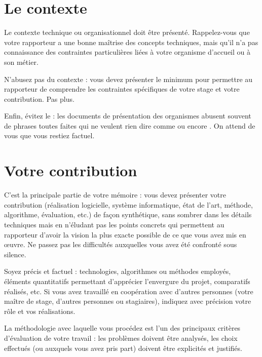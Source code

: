 \documentclass [twoside,openright,a4paper,11pt,french] {report}
\begin{document}
\section {Le contexte}

Le contexte technique ou organisationnel doit être présenté.
Rappelez-vous que votre rapporteur a une bonne maîtrise des concepts
techniques, mais qu'il n'a pas connaissance des contraintes particulières
liées à votre organisme d'accueil ou à son métier.

N'abusez pas du contexte : vous devez présenter le minimum pour permettre
au rapporteur de comprendre les contraintes spécifiques de votre stage
et votre contribution. Pas plus.

Enfin, évitez le  : les documents de
présentation des organismes abusent souvent de phrases toutes faites qui
ne veulent rien dire comme  ou encore . On attend de vous que vous restiez factuel.


\section {Votre contribution}

C'est la principale partie de votre mémoire : vous devez présenter votre
contribution (réalisation logicielle, système informatique, état de
l'art, méthode, algorithme, évaluation, etc.) de façon synthétique,
sans sombrer dans les détails techniques mais en n'éludant pas les
points concrets qui permettent au rapporteur d'avoir la vision la plus
exacte possible de ce que vous avez mis en œuvre. Ne passez pas
les difficultés auxquelles vous avez été confronté sous silence.

Soyez précis et factuel : technologies, algorithmes ou méthodes
employés, éléments quantitatifs permettant d'apprécier l'envergure
du projet, comparatifs réalisés, etc. Si vous avez travaillé en
coopération avec d'autres personnes (votre maître de stage, d'autres
personnes ou stagiaires), indiquez avec précision votre rôle et vos
réalisations.

La méthodologie avec laquelle vous procédez est l'un des principaux
critères d'évaluation de votre travail : les problèmes doivent
être analysés, les choix effectués (ou auxquels vous avez pris part)
doivent être explicités et justifiés.
\end{document}
